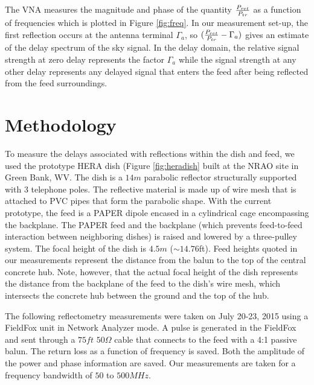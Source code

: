 \documentclass[12pt,preprint]{aastex}
\begin{document}
The VNA measures the magnitude and phase of the quantity ${P_{ret}\over P_{tr}}$ as a function of frequencies which is plotted in Figure \ref{fig:freq}. In our measurement set-up, the first reflection occurs at the antenna terminal $\Gamma_{a}$, so $({P_{ret} \over P_{tr} }  - \Gamma_{a}) $ gives an estimate of the delay spectrum of the sky signal. In the delay domain, the relative signal strength at zero delay represents the factor $\Gamma_{a}$ while the signal strength at any other delay represents any delayed signal that enters the feed after being reflected from the feed surroundings. 

\section{Methodology}{\label{sec:methods}}

To measure the delays associated with reflections within the dish and feed, we
used the prototype HERA dish (Figure \ref{fig:heradish} built at the NRAO site in
Green Bank, WV. The dish is a $14m$ parabolic reflector structurally supported
with 3 telephone poles. The reflective material is made up of wire mesh that
is attached to PVC pipes that form the parabolic shape. With the current
prototype, the feed is a PAPER dipole encased in a cylindrical cage encompassing
the backplane. The PAPER feed and the backplane (which prevents feed-to-feed
interaction between neighboring dishes) is raised and lowered by a three-pulley
system. The focal height of the dish is $4.5m$ ($\sim{14.76}$ft). Feed heights quoted in our measurements represent the distance from the balun to the top of the central concrete hub. Note, however, that the actual focal height of the dish represents the distance from the backplane of the feed to the dish's wire mesh, which intersects the concrete hub between the ground and the top of the hub. 

The following reflectometry measurements were taken on July 20-23, 2015 using a
FieldFox unit in Network Analyzer mode. A pulse is generated in the FieldFox
and sent through a $75ft$ $50\Omega$ cable that connects to the feed with a 4:1
passive balun. The return loss as a function of frequency is saved. Both
the amplitude of the power and phase information are saved. Our
measurements are taken for a frequency bandwidth of $50$ to $500MHz$. 
\end{document}
